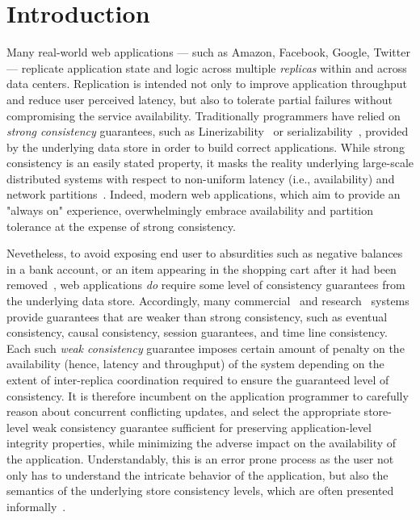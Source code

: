\section{Introduction}

Many real-world web applications --- such as Amazon, Facebook, Google, Twitter
--- replicate application state and logic across multiple \emph{replicas} within
and across data centers. Replication is intended not only to improve application
throughput and reduce user perceived latency, but also to tolerate partial
failures without compromising the service availability. Traditionally
programmers have relied on \emph{strong consistency} guarantees, such as
Linerizability~\cite{Herlihy1990} or serializability~\cite{Serializability},
provided by the underlying data store in order to build correct applications.
While strong consistency is an easily stated property, it
masks the reality underlying large-scale distributed systems with respect to
non-uniform latency (i.e., availability) and network
partitions~\cite{Brewer2000,Gilbert}. Indeed, modern web applications, which aim to provide
an "always on" experience, overwhelmingly embrace availability and partition
tolerance at the expense of strong consistency. 

Nevetheless, to avoid exposing end user to absurdities such as negative balances
in a bank account, or an item appearing in the shopping cart after it had been
removed~\cite{Dynamo}, web applications \emph{do} require some level of
consistency guarantees from the underlying data store. Accordingly, many
commercial~\cite{} and research~\cite{} systems provide guarantees that are
weaker than strong consistency, such as eventual consistency, causal
consistency, session guarantees, and time line consistency. Each such \emph{weak
consistency} guarantee imposes certain amount of penalty on the availability
(hence, latency and throughput) of the system depending on the extent of
inter-replica coordination required to ensure the guaranteed level of
consistency. It is therefore incumbent on the application programmer to
carefully reason about concurrent conflicting updates, and select the
appropriate store-level weak consistency guarantee sufficient for preserving
application-level integrity properties, while minimizing the adverse impact on
the availability of the application. Understandably, this is an error prone
process as the user not only has to understand the intricate behavior of the
application, but also the semantics of the underlying store consistency levels,
which are often presented informally~\cite{}.

